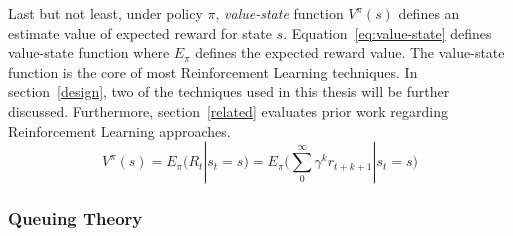 Last but not least, under policy $\pi$, \emph{value-state} function $V^\pi(s)$ defines an estimate value of expected reward for state $s$. Equation~\ref{eq:value-state} defines value-state function where $E_\pi$ defines the expected reward value. The value-state function is the core of most Reinforcement Learning techniques. In section~\ref{design}, two of the techniques used in this thesis will be further discussed. Furthermore, section~\ref{related} evaluates prior work regarding Reinforcement Learning approaches.
\begin{equation}
V^\pi(s) = E_\pi(R_t|s_t=s)=E_\pi\bigg(\sum_{0}^{\infty}\gamma^k r_{t+k+1}|s_t=s\bigg)
\label{eq:value-state}
\end{equation}

\subsubsection{Queuing Theory}

